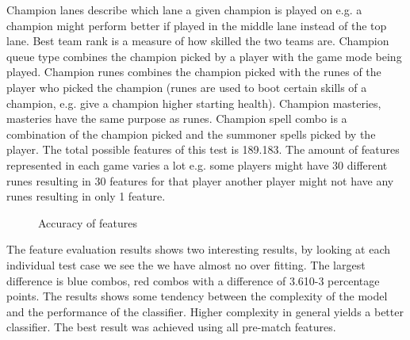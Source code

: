 Champion lanes describe which lane a given champion is played on e.g. a champion might perform better if played in the middle lane instead of the top lane. Best team rank is a measure of how skilled the two teams are. Champion queue type combines the champion picked by a player with the game mode being played. Champion runes combines the champion picked with the runes of the player who picked the champion (runes are used to boot certain skills of a champion, e.g. give a champion higher starting health). Champion masteries, masteries have the same purpose as runes. Champion spell combo is a combination of the champion picked and the summoner spells picked by the player. The total possible features of this test is 189.183. The amount of features represented in each game varies a lot e.g. some players might have 30 different runes resulting in 30 features for that player another player might not have any runes resulting in only 1 feature.
\begin{figure}[!htb]
  \centering
   \caption{Accuracy of features}\label{fig:cluster-feat}
\end{figure}
The feature evaluation results shows two interesting results, by looking at each individual test case we see the we have almost no over fitting. The largest difference is blue combos, red combos with a difference of 3.610-3 percentage points. The results shows some tendency between the complexity of the model and the performance of the classifier. Higher complexity in general yields a better classifier. The best result was achieved using all pre-match features.
